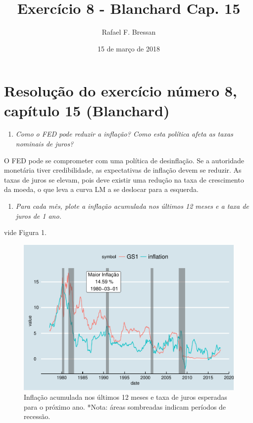\documentclass[]{article}
\title{Exercício 8 - Blanchard Cap. 15}
\author{Rafael F. Bressan}
\date{15 de março de 2018}
\providecommand{\tightlist}{%
  \setlength{\itemsep}{0pt}\setlength{\parskip}{0pt}}
\begin{document}
\maketitle

\section{Resolução do exercício número 8, capítulo 15
(Blanchard)}\label{resolucao-do-exercicio-numero-8-capitulo-15-blanchard}

\begin{enumerate}
\def\labelenumi{\alph{enumi}.}
\tightlist
\item
  \emph{Como o FED pode reduzir a inflação? Como esta política afeta as
  taxas nominais de juros?}
\end{enumerate}

O FED pode se comprometer com uma política de desinflação. Se a
autoridade monetária tiver credibilidade, as expectativas de inflação
devem se reduzir. As taxas de juros se elevam, pois deve existir uma
redução na taxa de crescimento da moeda, o que leva a curva LM a se
deslocar para a esquerda.

\begin{enumerate}
\def\labelenumi{\alph{enumi}.}
\setcounter{enumi}{1}
\tightlist
\item
  \emph{Para cada mês, plote a inflação acumulada nos últimos 12 meses e
  a taxa de juros de 1 ano.}
\end{enumerate}

vide Figura 1.

\begin{figure}
\centering
\includegraphics{Blanchar08-cap15_files/figure-latex/b_ggplot-1.pdf}
\caption{Inflação acumulada nos últimos 12 meses e taxa de juros
esperadas para o próximo ano. *Nota: áreas sombreadas indicam períodos
de recessão.}
\end{figure}
\end{document}
